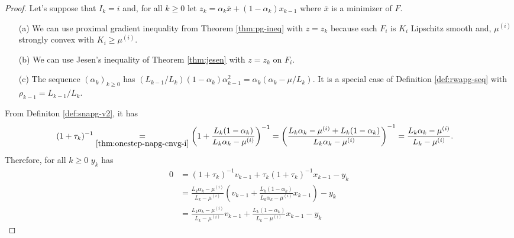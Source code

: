 \documentclass[12pt]{article}
\begin{document}
        \begin{theorem}
            
        \end{theorem}
        \begin{proof}
            Let's suppose that $I_k = i$ and, for all $k \ge 0$ let $z_k = \alpha_k \bar x + (1 - \alpha_k)x_{k - 1}$ where $\bar x$ is a minimizer of $F$. 
            \begin{itemize}
                \item[(a)] We can use proximal gradient inequality from Theorem \ref{thm:pg-ineq} with $z = z_k$ because each $F_i$ is $K_i$ Lipschitz smooth and, $\mu^{(i)}$ strongly convex with $K_i \ge \mu^{(i)}$. 
                \item[(b)] We can use Jesen's inequality of Theorem \ref{thm:jesen} with $z = z_k$ on $F_i$. 
                \item[(c)] The sequence $(\alpha_k)_{k \ge 0}$ has $(L_{k - 1}/L_k)(1 - \alpha_{k})\alpha_{k - 1}^2 = \alpha_{k}\left(\alpha_{k} - \mu/L_k\right)$. It is a special case of Definition \ref{def:rwapg-seq} with $\rho_{k - 1} = L_{k - 1}/L_k$. 
            \end{itemize}
            \par
            From Definiton \ref{def:snapg-v2}, it has
            \begin{align*}
                (1 + \tau_k)^{-1}
                &\underset{\eqref{thm:onestep-napg-cnvg-i}}{=} 
                \left(
                    1 + \frac{L_k(1 - \alpha_k)}{L_k\alpha_k - \mu^{(i)}}
                \right)^{-1} = \left(
                    \frac{L_k\alpha_k - \mu^{(i)} + L_k(1 - \alpha_k)}{L_k\alpha_k - \mu^{(i)}}
                \right)^{-1}
                = \frac{L_k\alpha_k - \mu^{(i)}}{L_k - \mu^{(i)}}. 
            \end{align*}
            Therefore, for all $k \ge 0$ $y_k$ has 
            \begin{align*}
                0 &= (1 + \tau_k)^{-1} v_{k - 1} + \tau_k (1 + \tau_k)^{-1} x_{k - 1} - y_k
                \\
                &= \frac{L_k\alpha_k - \mu^{(i)}}{L_k - \mu^{(i)}} 
                \left(
                    v_{k - 1} + \frac{L_k(1 - \alpha_k)}{L_k\alpha_k - \mu^{(i)}} x_{k - 1}
                \right) - y_k
                \\
                &= \frac{L_k\alpha_k - \mu^{(i)}}{L_k - \mu^{(i)}} v_{k - 1}
                + \frac{L_k(1 - \alpha_k)}{L_k - \mu^{(i)}} x_{k - 1} - y_k

\end{align*}
\end{proof}
\end{document}
